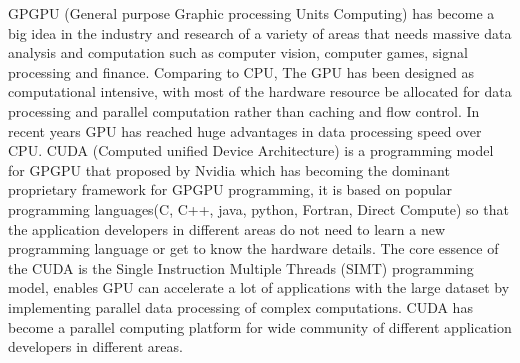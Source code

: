 \documentclass[12pt,a4paper,final]{article}
\begin{document}
\begin{spacing}{2.5}
GPGPU (General purpose Graphic processing Units Computing) has become a big idea in the industry and research of a variety of areas that needs massive data analysis and computation such as computer vision\cite{fung2008using}, computer games\cite{blewitt2013applicability}, signal processing\cite{van2011accelerating}\cite{6671435} and finance\cite{grauer2013accelerating}. Comparing to CPU, The GPU has been designed as computational intensive, with most of the hardware resource be allocated for data processing and parallel computation rather than caching and flow control. In recent years GPU has reached huge advantages in data processing speed over CPU\cite{nvidia2008programming}.  CUDA (Computed unified Device Architecture) is a programming model for GPGPU that proposed by Nvidia which has becoming the dominant proprietary framework for GPGPU programming, it is based on popular programming languages(C, C++, java, python, Fortran, Direct Compute) so that the application developers in different areas do not need to learn a new programming language or get to know the hardware details. The core essence of the CUDA is the Single Instruction Multiple Threads (SIMT) programming model, enables GPU can accelerate a lot of applications with the large dataset by implementing parallel data processing of complex computations. CUDA has become a parallel computing platform for wide community of different application developers in different areas.  

\end{spacing}
\end{document}
